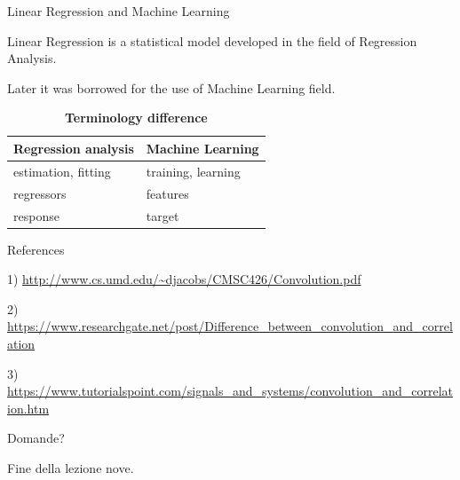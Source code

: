 \documentclass{beamer}
\begin{document}

\begin{frame}
{\centerline{Linear Regression and Machine Learning}}
Linear Regression is a statistical model developed in the field of Regression Analysis.

Later it was borrowed for the use of Machine Learning field.

\begin{table}[]
\centering
\caption{\textbf{Terminology difference}}
\begin{tabular}{|l|l|}
\hline
\textbf{Regression analysis} & \textbf{Machine Learning} \\ \hline
estimation, fitting          & training, learning         \\ \hline
regressors                   & features                   \\ \hline
response                     & target                    \\ \hline
\end{tabular}
\end{table}

\end{frame}


\begin{frame}
{ \centerline{References}}

1) \url{http://www.cs.umd.edu/~djacobs/CMSC426/Convolution.pdf}
\newline 

2) \url{https://www.researchgate.net/post/Difference\_between\_convolution\_and\_correlation}
\newline 

3) \url{https://www.tutorialspoint.com/signals\_and\_systems/convolution\_and\_correlation.htm}

\end{frame}


\begin{frame}
{\centerline{Domande?}}
\vspace{1cm}
\begin{center}
    \LARGE{Fine della lezione nove.}
\end{center}

\end{frame}


\end{document}
